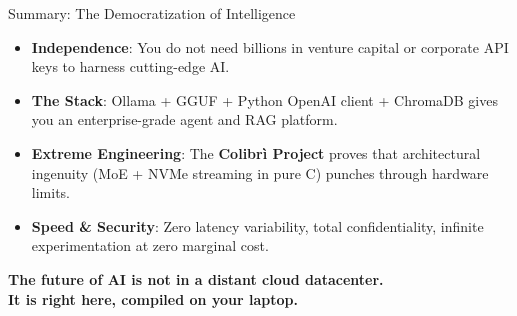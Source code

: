 \documentclass[10pt,aspectratio=169]{beamer}
\begin{document}
\begin{frame}{Summary: The Democratization of Intelligence}
    \begin{itemize}
        \item[\checkmark] \textbf{Independence}: You do not need billions in venture capital or corporate API keys to harness cutting-edge AI.
        \item[\checkmark] \textbf{The Stack}: Ollama + GGUF + Python OpenAI client + ChromaDB gives you an enterprise-grade agent and RAG platform.
        \item[\checkmark] \textbf{Extreme Engineering}: The \textbf{Colibr\`i Project} proves that architectural ingenuity (MoE + NVMe streaming in pure C) punches through hardware limits.
        \item[\checkmark] \textbf{Speed \& Security}: Zero latency variability, total confidentiality, infinite experimentation at zero marginal cost.
    \end{itemize}
    \vspace{0.4cm}
    \begin{tcolorbox}[colback=ShoeTeal!10, colframe=ShoeTeal, title=\textbf{Final Thought}]
        \large\centering
        \textbf{The future of AI is not in a distant cloud datacenter.\\It is right here, compiled on your laptop.}
    \end{tcolorbox}
\end{frame}
\end{document}
